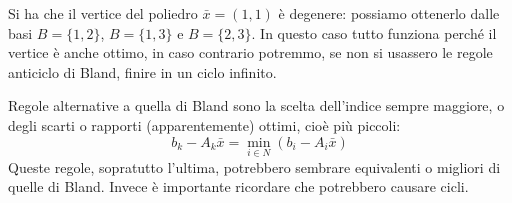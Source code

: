 \documentclass[a4paper,11pt]{article}
\begin{document}
Si ha che il vertice del poliedro $\bar{x} = (1,1)$ è degenere: possiamo ottenerlo dalle basi $B = \{ 1, 2 \}$, $B = \{ 1, 3 \}$ e $B = \{ 2, 3\}$.
In questo caso tutto funziona perché il vertice è anche ottimo, in caso contrario potremmo, se non si usassero le regole anticiclo di Bland, finire in un ciclo infinito.

Regole alternative a quella di Bland sono la scelta dell'indice sempre maggiore, o degli scarti o rapporti (apparentemente) ottimi, cioè più piccoli:
$$
b_k - A_k \bar{x} = \min_{i \in N}\left( b_i - A_i \bar{x} \right)
$$
Queste regole, sopratutto l'ultima, potrebbero sembrare equivalenti o migliori di quelle di Bland.
Invece è importante ricordare che potrebbero causare cicli.
\end{document}
